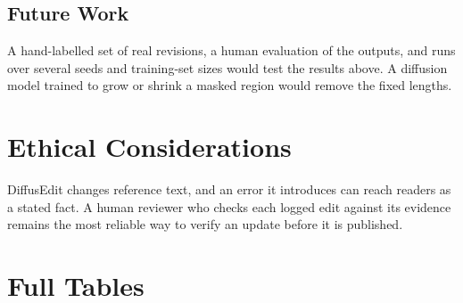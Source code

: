 \documentclass[11pt]{article}
\begin{document}
\subsection{Future Work}

A hand-labelled set of real revisions, a human evaluation of the outputs, and runs over several seeds and training-set sizes would test the results above. A diffusion model trained to grow or shrink a masked region would remove the fixed lengths.

\section{Ethical Considerations}
DiffusEdit changes reference text, and an error it introduces can reach readers as a stated fact. A human reviewer who checks each logged edit against its evidence remains the most reliable way to verify an update before it is published.



\clearpage
\appendix
\raggedbottom

\section{Full Tables}
\label{sec:tables}
\begin{table}[H]
\centering
\small
\setlength{\tabcolsep}{4pt}
\caption{Classifier scores with seed 42 on validation and test, and the mean and standard deviation of the test score over five seeds where they were run. The sentence transformer is a linear classifier over sentence-transformer embeddings of the sentence and the evidence. Bold marks the best classifier for each measure.}
\label{tab:classifiers}
\end{table}
\end{document}
